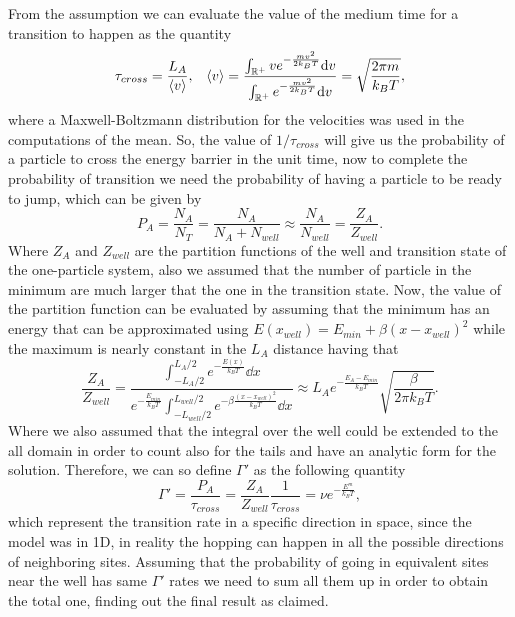 {
    From the assumption we can evaluate the value of the medium time for a transition to happen as the quantity
    \begin{align}
        &\tau_{cross} = \frac{L_A}{\left\langle v \right\rangle}, &\left\langle v \right\rangle = \frac{\int_{\mathbb{R}^+} ve^{-\frac{mv^2}{2k_BT}} \dd v}{\int_{\mathbb{R}^+} e^{-\frac{mv^2}{2k_BT}} \dd v} = \sqrt{\frac{2\pi m}{k_BT}},
    \end{align}
    where a Maxwell-Boltzmann distribution for the velocities was used in the computations of the mean. So, the value of $1/\tau_{cross}$ will give us the probability of a particle to cross the energy barrier in the unit time, now to complete the probability of transition we need the probability of having a particle to be ready to jump, which can be given by
    \begin{equation}
        P_{A} = \frac{N_A}{N_T} = \frac{N_A}{N_A + N_{well}} \approx \frac{N_A}{N_{well}} = \frac{Z_A}{Z_{well}}.
    \end{equation}
    Where $Z_A$ and $Z_{well}$ are the partition functions of the well and transition state of the one-particle system, also we assumed that the number of particle in the minimum are much larger that the one in the transition state. Now, the value of the partition function can be evaluated by assuming that the minimum has an energy that can be approximated using $E(x_{well}) = E_{min} + \beta(x - x_{well})^2$ while the maximum is nearly constant in the $L_A$ distance having that
    \begin{equation}
        \frac{Z_A}{Z_{well}} = \frac{\int_{-L_A/2}^{L_A/2} e^{-\frac{E(x)}{k_BT}}\dd x}{e^{-\frac{E_{min}}{k_BT}}\int_{-L_{well}/2}^{L_{well}/2} e^{-\beta\frac{(x - x_{well})^2}{k_BT}}\dd x} \approx L_Ae^{-\frac{E_A - E_{min}}{k_BT}}\sqrt{\frac{\beta}{2\pi k_BT}}.
    \end{equation}
    Where we also assumed that the integral over the well could be extended to the all domain in order to count also for the tails and have an analytic form for the solution. Therefore, we can so define $\Gamma'$ as the following quantity 
    \begin{equation}
        \Gamma' = \frac{P_A}{\tau_{cross}} = \frac{Z_A}{Z_{well}}\frac{1}{\tau_{cross}} = \nu e^{-\frac{E^m}{k_BT}},
    \end{equation}
    which represent the transition rate in a specific direction in space, since the model was in 1D, in reality the hopping can happen in all the possible directions of neighboring sites. Assuming that the probability of going in equivalent sites near the well has same $\Gamma'$ rates we need to sum all them up in order to obtain the total one, finding out the final result as claimed.
}
